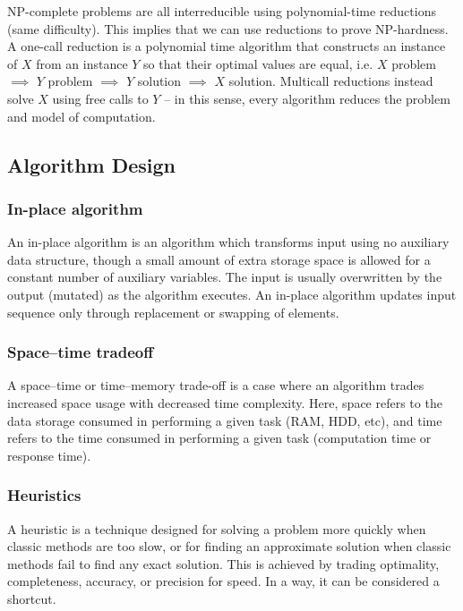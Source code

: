 \documentclass{article}
\begin{document}
    NP-complete problems are all interreducible using polynomial-time reductions (same difficulty). This implies that we can use reductions to prove NP-hardness. A one-call reduction is a polynomial time algorithm that constructs an instance of $X$ from an instance $Y$ so that their optimal values are equal, i.e. $X$ problem $\implies$ $Y$ problem $\implies$ $Y$ solution $\implies$ $X$ solution. Multicall reductions instead solve $X$ using free calls to $Y$ -- in this sense, every algorithm reduces the problem and model of computation.
    
    
    \subsection{Algorithm Design}
    \subsubsection{In-place algorithm}
        An in-place algorithm is an algorithm which transforms input using no auxiliary data structure, though a small amount of extra storage space is allowed for a constant number of auxiliary variables. The input is usually overwritten by the output (mutated) as the algorithm executes. An in-place algorithm updates input sequence only through replacement or swapping of elements.
        
    \subsubsection{Space–time tradeoff}
        A space–time or time–memory trade-off is a case where an algorithm trades increased space usage with decreased time complexity. Here, space refers to the data storage consumed in performing a given task (RAM, HDD, etc), and time refers to the time consumed in performing a given task (computation time or response time).
        
    \subsubsection{Heuristics}
        A heuristic is a technique designed for solving a problem more quickly when classic methods are too slow, or for finding an approximate solution when classic methods fail to find any exact solution. This is achieved by trading optimality, completeness, accuracy, or precision for speed. In a way, it can be considered a shortcut.
    
\end{document}
